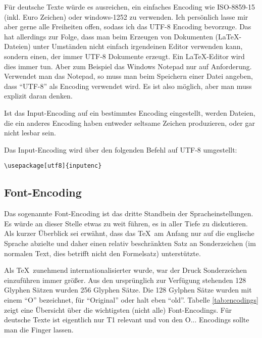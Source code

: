 Für deutsche Texte würde es ausreichen, ein einfaches Encoding wie ISO-8859-15 (inkl. Euro Zeichen) oder windows-1252 zu verwenden. Ich persönlich lasse mir aber gerne alle Freiheiten offen, sodass ich das UTF-8 Encoding bevorzuge. Das hat allerdings zur Folge, dass man beim Erzeugen von Dokumenten (\LaTeX-Dateien) unter Umständen nicht einfach irgendeinen Editor verwenden kann, sondern einen, der immer UTF-8 Dokumente erzeugt. Ein \LaTeX-Editor wird dies immer tun. Aber zum Beispiel das Windows Notepad nur auf Anforderung. Verwendet man das Notepad, so muss man beim Speichern einer Datei angeben, dass "`UTF-8"' als Encoding verwendet wird. Es ist also möglich, aber man muss explizit daran denken.

Ist das Input-Encoding auf ein bestimmtes Encoding eingestellt, werden Dateien, die ein anderes Encoding haben entweder seltsame Zeichen produzieren, oder gar nicht lesbar sein. 

Das Input-Encoding wird über den folgenden Befehl auf UTF-8 umgestellt:
\begin{verbatim}
\usepackage[utf8]{inputenc}
\end{verbatim}

\subsection{Font-Encoding}

Das sogenannte Font-Encoding ist das dritte Standbein der Spracheinstellungen. Es würde an dieser Stelle etwas zu weit führen, es in aller Tiefe zu diskutieren. Als kurzer Überblick sei erwähnt, dass das \TeX\ am Anfang nur auf die englische Sprache abzielte und daher einen relativ beschränkten Satz an Sonderzeichen (im normalen Text, dies betrifft nicht den Formelsatz) unterstützte. 

Als \TeX\ zunehmend internationalisierter wurde, war der Druck Sonderzeichen einzuführen immer größer. Aus den ursprünglich zur Verfügung stehenden 128 Glyphen Sätzen wurden 256 Glyphen Sätze. Die 128 Gylphen Sätze wurden mit einem "`O"' bezeichnet, für "`Original"' oder halt eben "`old"'. Tabelle \ref{tab:encodings} zeigt eine Übersicht über die wichtigsten (nicht alle) Font-Encodings. Für deutsche Texte ist eigentlich nur T1 relevant und von den O... Encodings sollte man die Finger lassen.

